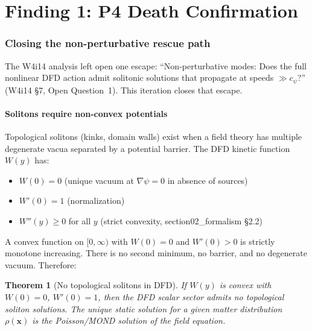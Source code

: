 \documentclass[11pt]{article}
\newtheorem{theorem}{Theorem}
\begin{document}
\newpage

\part{Finding 1: P4 Death Confirmation}
\label{part:death}

\section{Closing the non-perturbative rescue path}

The W4i14 analysis left open one escape: ``Non-perturbative modes: Does
the full nonlinear DFD action admit solitonic solutions that propagate
at speeds $\gg c_\psi$?'' (W4i14 \S7, Open Question~1). This iteration
closes that escape.

\subsection{Solitons require non-convex potentials}

Topological solitons (kinks, domain walls) exist when a field theory has
multiple degenerate vacua separated by a potential barrier. The DFD
kinetic function $W(y)$ has:
\begin{itemize}[nosep]
\item $W(0) = 0$ (unique vacuum at $\nabla\psi = 0$ in absence of sources)
\item $W'(0) = 1$ (normalization)
\item $W''(y) \geq 0$ for all $y$ (strict convexity, section02\_formalism \S2.2)
\end{itemize}

A convex function on $[0,\infty)$ with $W(0) = 0$ and $W'(0) > 0$ is
strictly monotone increasing. There is no second minimum, no barrier,
and no degenerate vacuum. Therefore:

\begin{theorem}[No topological solitons in DFD]
\label{thm:no-soliton}
If $W(y)$ is convex with $W(0) = 0$, $W'(0) = 1$, then the DFD scalar
sector admits no topological soliton solutions. The unique static solution
for a given matter distribution $\rho(\mathbf{x})$ is the Poisson/MOND
solution of the field equation.
\end{theorem}
\end{document}
